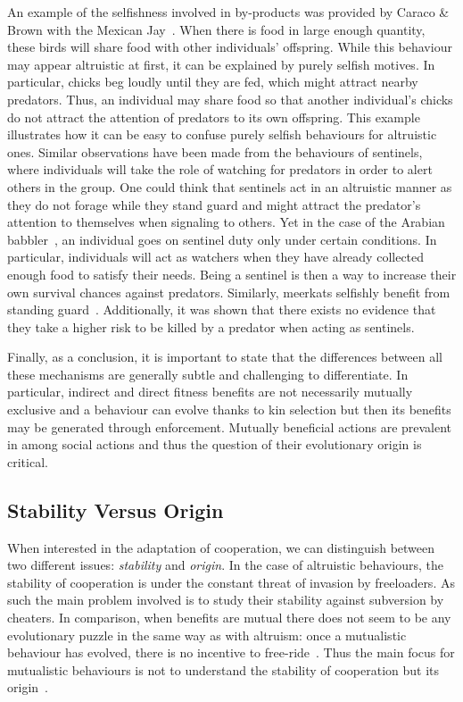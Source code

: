     An example of the selfishness involved in by-products was provided by Caraco \& Brown with the Mexican Jay~\parencite{Caraco1986, Dugatkin2002}. When there is food in large enough quantity, these birds will share food with other individuals' offspring. While this behaviour may appear altruistic at first, it can be explained by purely selfish motives. In particular, chicks beg loudly until they are fed, which might attract nearby predators. Thus, an individual may share food so that another individual's chicks do not attract the attention of predators to its own offspring. This example illustrates how it can be easy to confuse purely selfish behaviours for altruistic ones. Similar observations have been made from the behaviours of sentinels, where individuals will take the role of watching for predators in order to alert others in the group. One could think that sentinels act in an altruistic manner as they do not forage while they stand guard and might attract the predator's attention to themselves when signaling to others. Yet in the case of the Arabian babbler~\parencite{Wright2001}, an individual goes on sentinel duty only under certain conditions. In particular, individuals will act as watchers when they have already collected enough food to satisfy their needs. Being a sentinel is then a way to increase their own survival chances against predators. Similarly, meerkats selfishly benefit from standing guard~\parencite{CluttonBrock1999}. Additionally, it was shown that there exists no evidence that they take a higher risk to be killed by a predator when acting as sentinels.

    Finally, as a conclusion, it is important to state that the differences between all these mechanisms are generally subtle and challenging to differentiate. In particular, indirect and direct fitness benefits are not necessarily mutually exclusive and a behaviour can evolve thanks to kin selection but then its benefits may be generated through enforcement. Mutually beneficial actions are prevalent in among social actions and thus the question of their evolutionary origin is critical.
    

  \subsection{Stability Versus Origin}

    When interested in the adaptation of cooperation, we can distinguish between two different issues: \emph{stability} and \emph{origin}. In the case of altruistic behaviours, the stability of cooperation is under the constant threat of invasion by freeloaders. As such the main problem involved is to study their stability against subversion by cheaters. In comparison, when benefits are mutual there does not seem to be any evolutionary puzzle in the same way as with altruism: once a mutualistic behaviour has evolved, there is no incentive to free-ride~\parencite{Forber2015}. Thus the main focus for mutualistic behaviours is not to understand the stability of cooperation but its origin~\parencite{West2007}.

